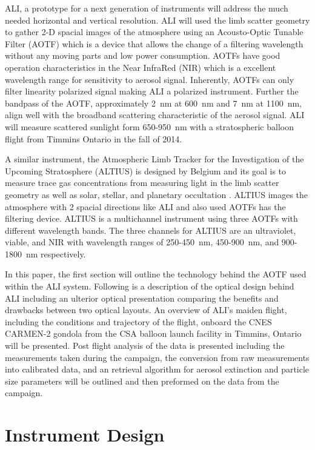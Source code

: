 \documentclass[12pt]{article}
\begin{document}
ALI, a prototype for a next generation of instruments will address the much needed horizontal and vertical resolution. ALI will used the limb scatter geometry to gather 2-D spacial images of the atmosphere using an Acousto-Optic Tunable Filter (AOTF) which is a device that allows the change of a filtering wavelength without any moving parts and low power consumption. AOTFs have good operation characteristics in the Near InfraRed (NIR) which is a excellent wavelength range for sensitivity to aerosol signal. Inherently, AOTFs can only filter linearity polarized signal making ALI a polarized instrument. Further the bandpass of the AOTF, approximately 2~nm at 600~nm and 7~nm at 1100~nm, align well with the broadband scattering characteristic of the aerosol signal. ALI will measure scattered sunlight form 650-950~nm with a stratospheric balloon flight from Timmins Ontario in the fall of 2014.

A similar instrument, the Atmospheric Limb Tracker for the Investigation of the Upcoming Stratosphere (ALTIUS) is designed by Belgium and its goal is to measure trace gas concentrations from measuring light in the limb scatter geometry as well as solar, stellar, and planetary occultation \citep{Dekemper2012}. ALTIUS images the atmosphere with 2 spacial directions like ALI and also used AOTFs has the filtering device. ALTIUS is a multichannel instrument using three AOTFs with different wavelength bands. The three channels for ALTIUS are an ultraviolet, viable, and NIR with wavelength ranges of 250-450~nm, 450-900~nm, and 900-1800~nm respectively.

In this paper, the first section will outline the technology behind the AOTF used within the ALI system. Following is a description of the optical design behind ALI including an ulterior optical presentation comparing the benefits and drawbacks between two optical layouts. An overview of ALI's maiden flight, including the conditions and trajectory of the flight, onboard the CNES CARMEN-2 gondola from the CSA balloon launch facility in Timmins, Ontario will be presented. Post flight analysis of the data is presented including the measurements taken during the campaign, the conversion from raw measurements into calibrated data, and an retrieval algorithm for aerosol extinction and particle size parameters will be outlined and then preformed on the data from the campaign.

\section{Instrument Design}
\end{document}
